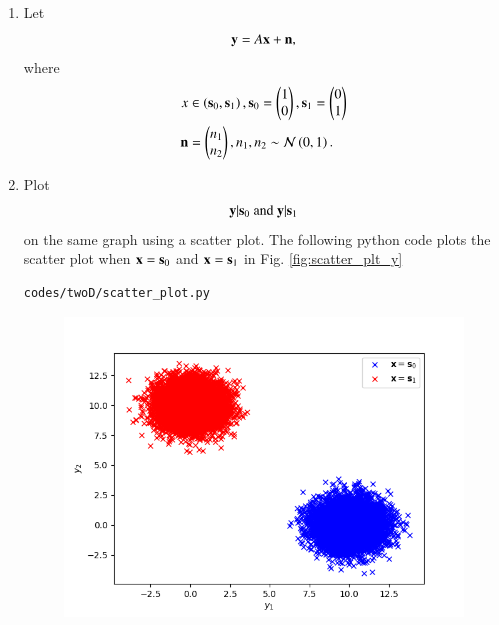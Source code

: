 \begin{enumerate}[label=\thesection.\arabic*.,ref=\thesection.\theenumi]
\item Let 
\begin{equation}
\mathbf{y} = A\mathbf{x} + \mathbf{n},
\end{equation}
where 
\begin{align}
x &\in \left(\mathbf{s}_0,\mathbf{s}_1\right), 
\mathbf{s}_0 = 
\begin{pmatrix}
1 
\\
0
\end{pmatrix},
\mathbf{s}_1 = 
\begin{pmatrix}
0 
\\
1
\end{pmatrix}
\\
\mathbf{n} &= 
\begin{pmatrix}
n_1
\\
n_2
\end{pmatrix},
n_1,n_2 \sim \mathcal{N}\left(0,1\right).
\end{align}
%
\item
\label{ch5_fsk}
Plot 
%
\begin{equation}
\mathbf{y}|\mathbf{s}_0 \text{ and } \mathbf{y}|\mathbf{s}_1
\end{equation}
%
on the same graph using a scatter plot.
%
\solution The following python code plots the scatter plot when $\mathbf{x} = \mathbf{s}_0$ and $\mathbf{x} = \mathbf{s}_1$ in Fig. \ref{fig:scatter_plt_y}
\begin{lstlisting}
codes/twoD/scatter_plot.py
\end{lstlisting}
\begin{figure}
\centering
\includegraphics[width=\columnwidth]{./figs/twoD/scatter_plot.png}

\end{figure}
\end{enumerate}
